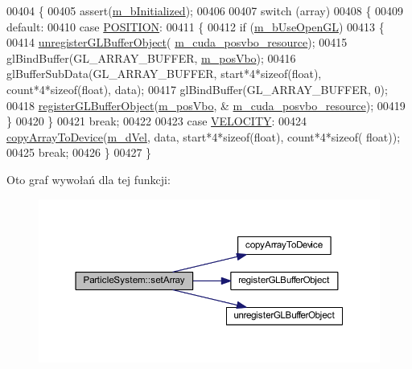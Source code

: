 \begin{DoxyCode}
00404 \{
00405     assert(\hyperlink{class_particle_system_a21bbfba9d8701a70bc6fddbf4fc3f5bd}{m\_bInitialized});
00406 
00407     \textcolor{keywordflow}{switch} (array)
00408     \{
00409         \textcolor{keywordflow}{default}:
00410         \textcolor{keywordflow}{case} \hyperlink{class_particle_system_a332fbe57a36aaea5c18b4ea4fba6bbb3a9e9a2992d230a2674debf26e0e8e0299}{POSITION}:
00411             \{
00412                 \textcolor{keywordflow}{if} (\hyperlink{class_particle_system_a5d99413ffc0791e6aa9f02308caf7f1e}{m\_bUseOpenGL})
00413                 \{
00414                     \hyperlink{particle_system_8cuh_a9afef8c00ca779aae2d7484b45bce34c}{unregisterGLBufferObject}(
      \hyperlink{class_particle_system_a9c5de70c1705672e5722ad30dee1b14b}{m\_cuda\_posvbo\_resource});
00415                     glBindBuffer(GL\_ARRAY\_BUFFER, \hyperlink{class_particle_system_a31f9cccdf5dbae6f72867665bd8761e3}{m\_posVbo});
00416                     glBufferSubData(GL\_ARRAY\_BUFFER, start*4*\textcolor{keyword}{sizeof}(\textcolor{keywordtype}{float}), count*4*\textcolor{keyword}{sizeof}(\textcolor{keywordtype}{float}), data);
00417                     glBindBuffer(GL\_ARRAY\_BUFFER, 0);
00418                     \hyperlink{particle_system_8cuh_a4386a84282ceeaba09939817aa2a9c24}{registerGLBufferObject}(\hyperlink{class_particle_system_a31f9cccdf5dbae6f72867665bd8761e3}{m\_posVbo}, &
      \hyperlink{class_particle_system_a9c5de70c1705672e5722ad30dee1b14b}{m\_cuda\_posvbo\_resource});
00419                 \}
00420             \}
00421             \textcolor{keywordflow}{break};
00422 
00423         \textcolor{keywordflow}{case} \hyperlink{class_particle_system_a332fbe57a36aaea5c18b4ea4fba6bbb3a3702de73065f01b4f6ffa604b799e53d}{VELOCITY}:
00424             \hyperlink{particle_system_8cuh_ac4d4ecd921dbed6c2deef639ca295374}{copyArrayToDevice}(\hyperlink{class_particle_system_a5efd31a2fdba8d98b105f4e546964cb5}{m\_dVel}, data, start*4*\textcolor{keyword}{sizeof}(\textcolor{keywordtype}{float}), count*4*\textcolor{keyword}{sizeof}(\textcolor{keywordtype}{
      float}));
00425             \textcolor{keywordflow}{break};
00426     \}
00427 \}
\end{DoxyCode}


Oto graf wywołań dla tej funkcji\-:\nopagebreak
\begin{figure}[H]
\begin{center}
\leavevmode
\includegraphics[width=350pt]{class_particle_system_aa792a66680e800832059854aab0d594d_cgraph}
\end{center}
\end{figure}





